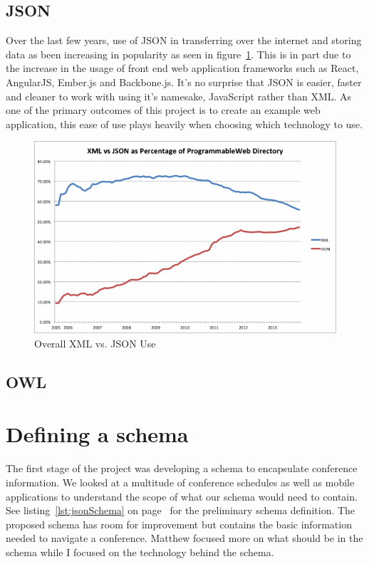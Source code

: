 \documentclass{article}
\begin{document}
\subsection{JSON}
Over the last few years, use of JSON in transferring over the internet and storing data as been increasing in popularity as seen in figure~\ref{fig:JSON_XML_all_time}. This is in part due to the increase in the usage of front end web application frameworks such as React, AngularJS, Ember.js and Backbone.js. It's no surprise that JSON is easier, faster and cleaner \cite{hellstrom2012querying,lin2012comparison,nurseitov2009comparison} to work with using it's namesake, JavaScript rather than XML. As one of the primary outcomes of this project is to create an example web application, this ease of use plays heavily when choosing which technology to use.
\begin{figure}[h]
	\centering
	\includegraphics[scale=0.37]{images/xml_json_all_time.png}
	\caption{Overall XML vs. JSON Use\protect\cite{duvander2013json}}
	\label{fig:JSON_XML_all_time}
\end{figure}

\subsection{OWL}

\section{Defining a schema}
The first stage of the project was developing a schema to encapsulate conference information. We looked at a multitude of conference schedules as well as mobile applications to understand the scope of what our schema would need to contain. See listing~\ref{lst:jsonSchema} on page~\pageref{lst:jsonSchema} for the preliminary schema definition. The proposed schema has room for improvement but contains the basic information needed to navigate a conference. Matthew focused more on what should be in the schema while I focused on the technology behind the schema.
\end{document}

